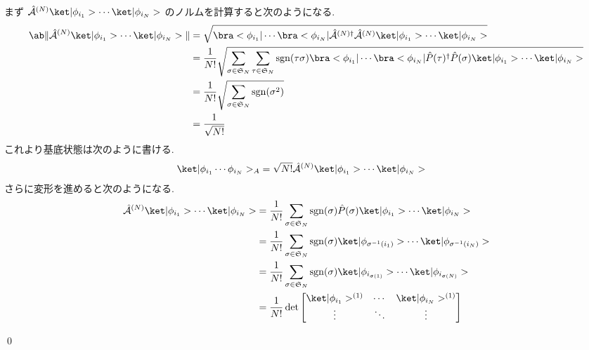 \documentclass[uplatex,dvipdfmx,a4paper,11pt]{jlreq}
\makeatletter
\DeclareMathOperator{\sgn}{sgn}
\DeclareMathOperator{\Det}{det}
\renewcommand{\SS}{\mathfrak{S}}
\newcommand{\A}{\mathcal{A}}
\numberwithin{equation}{section}
\theoremstyle{definition}
\renewenvironment{proof}[1][\proofname]{\par
  \normalfont
  \topsep6\p@\@plus6\p@ \trivlist
  \item[\hskip\labelsep{\bfseries #1}\@addpunct{\bfseries}]\ignorespaces\quad\par
}{
  \qed\endtrivlist\@endpefalse
}
\renewcommand\proofname{証明}
\makeatother
\begin{document}
\begin{proof}
  まず $\hat{\A}^{(N)}\ket|\phi_{i_1}>\cdots\ket|\phi_{i_N}>$ のノルムを計算すると次のようになる.
  \begin{align}
    \ab\|\hat{\A}^{(N)}\ket|\phi_{i_1}>\cdots\ket|\phi_{i_N}>\| & = \sqrt{\bra<\phi_{i_1}|\cdots\bra<\phi_{i_N}|\hat{\A}^{(N)\dagger}\hat{\A}^{(N)}\ket|\phi_{i_1}>\cdots\ket|\phi_{i_N}>}                                                                      \\
                                                                & = \frac{1}{N!}\sqrt{\sum_{\sigma\in\SS_N}\sum_{\tau\in\SS_N}\sgn(\tau\sigma)\bra<\phi_{i_1}|\cdots\bra<\phi_{i_N}|\hat{P}(\tau)^\dagger\hat{P}(\sigma)\ket|\phi_{i_1}>\cdots\ket|\phi_{i_N}>} \\
                                                                & = \frac{1}{N!}\sqrt{\sum_{\sigma\in\SS_N}\sgn(\sigma^2)}                                                                                                                                      \\
                                                                & = \frac{1}{\sqrt{N!}}
  \end{align}
  これより基底状態は次のように書ける.
  \begin{align}
    \ket|\phi_{i_1}\cdots\phi_{i_N}>_A & = \sqrt{N!}\hat{\A}^{(N)}\ket|\phi_{i_1}>\cdots\ket|\phi_{i_N}>
  \end{align}
  さらに変形を進めると次のようになる.
  \begin{align}
    \hat{\A}^{(N)}\ket|\phi_{i_1}>\cdots\ket|\phi_{i_N}> & = \frac{1}{N!}\sum_{\sigma\in\SS_N}\sgn(\sigma)\hat{P}(\sigma)\ket|\phi_{i_1}>\cdots\ket|\phi_{i_N}>            \\
                                                         & = \frac{1}{N!}\sum_{\sigma\in\SS_N}\sgn(\sigma)\ket|\phi_{\sigma^{-1}(i_1)}>\cdots\ket|\phi_{\sigma^{-1}(i_N)}> \\
                                                         & = \frac{1}{N!}\sum_{\sigma\in\SS_N}\sgn(\sigma)\ket|\phi_{i_{\sigma(1)}}>\cdots\ket|\phi_{i_{\sigma(N)}}>       \\
                                                         & = \frac{1}{N!}\Det\begin{bmatrix}
                                                                               \ket|\phi_{i_1}>^{(1)} & \cdots & \ket|\phi_{i_N}>^{(1)} \\
                                                                               \vdots                 & \ddots & \vdots                 \\

\end{bmatrix}
\end{align}
\end{proof}
\end{document}

